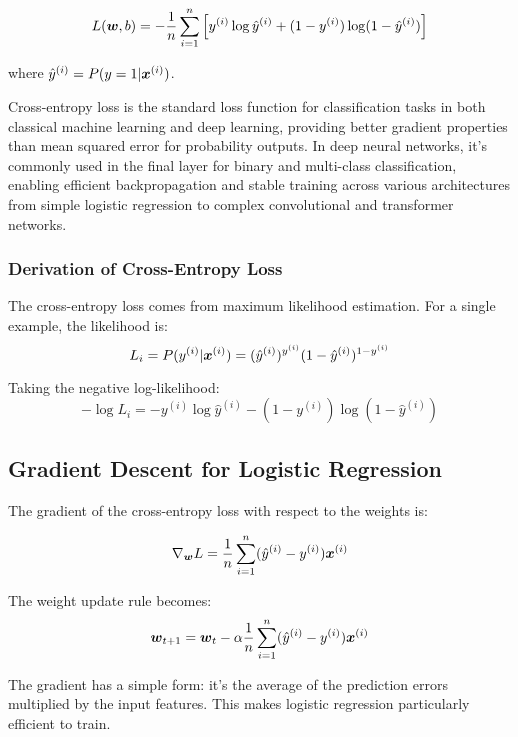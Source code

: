 \begin{equation}
L(\boldsymbol{w}, b) = -\frac{1}{n} \sum_{i=1}^{n} \left[y^{(i)} \log \hat{y}^{(i)} + (1-y^{(i)}) \log(1-\hat{y}^{(i)})\right]
\end{equation}

where $\hat{y}^{(i)} = P(y=1|\boldsymbol{x}^{(i)})$.

\begin{remark}
Cross-entropy loss is the standard loss function for classification tasks in both classical machine learning and deep learning, providing better gradient properties than mean squared error for probability outputs. In deep neural networks, it's commonly used in the final layer for binary and multi-class classification, enabling efficient backpropagation and stable training across various architectures from simple logistic regression to complex convolutional and transformer networks.
\end{remark}

\subsubsection{Derivation of Cross-Entropy Loss}

The cross-entropy loss comes from maximum likelihood estimation. For a single example, the likelihood is:
$$L_i = P(y^{(i)}|\boldsymbol{x}^{(i)}) = (\hat{y}^{(i)})^{y^{(i)}} (1-\hat{y}^{(i)})^{1-y^{(i)}}$$

Taking the negative log-likelihood:
$$-\log L_i = -y^{(i)} \log \hat{y}^{(i)} - (1-y^{(i)}) \log(1-\hat{y}^{(i)})$$

\subsection{Gradient Descent for Logistic Regression}

The gradient of the cross-entropy loss with respect to the weights is:

\begin{equation}
\nabla_{\boldsymbol{w}} L = \frac{1}{n} \sum_{i=1}^{n} (\hat{y}^{(i)} - y^{(i)}) \boldsymbol{x}^{(i)}
\end{equation}

The weight update rule becomes:
\begin{equation}
\boldsymbol{w}_{t+1} = \boldsymbol{w}_t - \alpha \frac{1}{n} \sum_{i=1}^{n} (\hat{y}^{(i)} - y^{(i)}) \boldsymbol{x}^{(i)}
\end{equation}

\begin{remark}
The gradient has a simple form: it's the average of the prediction errors multiplied by the input features. This makes logistic regression particularly efficient to train.
\end{remark}

